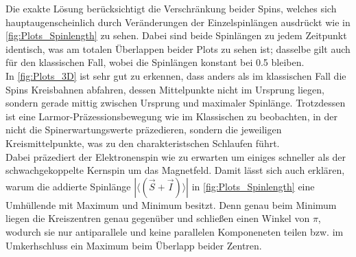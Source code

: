 Die exakte Lösung berücksichtigt die Verschränkung beider Spins, welches sich hauptaugenscheinlich durch Veränderungen der Einzelspinlängen ausdrückt 
wie in \autoref{fig:Plots_Spinlength} zu sehen. Dabei sind beide Spinlängen zu jedem Zeitpunkt identisch, was am totalen 
Überlappen beider Plots zu sehen ist; dasselbe gilt auch für den klassischen Fall, wobei die Spinlängen konstant bei 0.5 bleiben.\\
In \autoref{fig:Plots_3D} ist sehr gut zu erkennen, dass anders als im klassischen Fall die Spins Kreisbahnen abfahren, dessen Mittelpunkte nicht 
im Ursprung liegen, sondern gerade mittig zwischen Ursprung und maximaler Spinlänge. Trotzdessen ist eine Larmor-Präzessionsbewegung wie im Klassischen 
zu beobachten, in der nicht die Spinerwartungswerte präzedieren, sondern die jeweiligen Kreismittelpunkte, was zu den charakteristschen Schlaufen führt.\\
Dabei präzediert der Elektronenspin wie zu erwarten um einiges schneller als der schwachgekoppelte Kernspin um das Magnetfeld. Damit lässt sich auch 
erklären, warum die addierte Spinlänge $|\langle \left( \vec{S}+\vec{I} \right)\rangle |$ in \autoref{fig:Plots_Spinlength} eine Umhüllende mit Maximum
und Minimum besitzt. Denn genau beim Minimum liegen die Kreiszentren genau gegenüber und schließen einen Winkel von $\pi$, wodurch sie nur antiparallele
und keine parallelen Komponeneten teilen bzw. im Umkerhschluss ein Maximum beim Überlapp beider Zentren.
